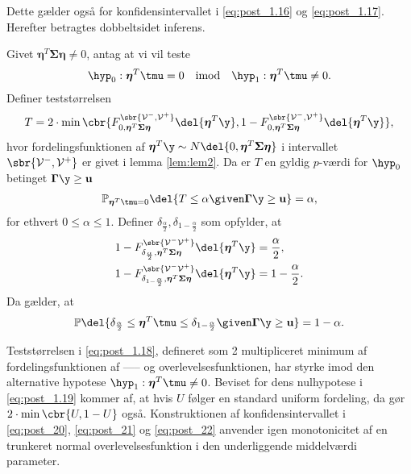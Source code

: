 Dette gælder også for konfidensintervallet i \eqref{eq:post_1.16} og \eqref{eq:post_1.17}.
Herefter betragtes dobbeltsidet inferens.
%
\begin{lem} \label{lem:lem4}
Givet \(\boldsymbol{\eta}^T \boldsymbol{\Sigma} \boldsymbol{\eta} \neq 0\), antag at vi vil teste
\begin{align*}
\hyp_0: \boldsymbol{\eta}^T \tmu=0 \quad \text{imod} \quad \hyp_1: \boldsymbol{\eta}^T \tmu \neq 0.
\end{align*}
Definer teststørrelsen
\begin{align}
T=2 \cdot \min\cbr{F_{0, \boldsymbol{\eta}^T \boldsymbol{\Sigma} \boldsymbol{\eta}}^{\sbr{\mathcal{V}^-, \mathcal{V}^+}} \del{\boldsymbol{\eta}^T \y}, 1 - F_{0, \boldsymbol{\eta}^T \boldsymbol{\Sigma} \boldsymbol{\eta}}^{\sbr{\mathcal{V}^-, \mathcal{V}^+}} \del{\boldsymbol{\eta}^T \y}}, \label{eq:post_1.18}
\end{align}
hvor fordelingsfunktionen af \(\boldsymbol{\eta}^T \y \sim N \del{0,  \boldsymbol{\eta}^T \boldsymbol{\Sigma} \boldsymbol{\eta}}\) i intervallet \(\sbr{\mathcal{V}^-, \mathcal{V}^+}\) er givet i lemma \ref{lem:lem2}.
Da er \(T\) en gyldig \(p\)-værdi for \(\hyp_0\) betinget \(\boldsymbol{\Gamma} \y \geq \mathbf{u}\)
\begin{align}
\mathbb{P}_{\boldsymbol{\eta}^T \tmu=0} \del{T \leq \alpha \given \boldsymbol{\Gamma} \y \geq \mathbf{u}} = \alpha, \label{eq:post_1.19}
\end{align}
for ethvert \(0 \leq \alpha \leq 1\). 
Definer \(\delta_{\frac{\alpha}{2}}, \delta_{1-\frac{\alpha}{2}}\) som opfylder, at
\begin{align}
1-F_{\delta_{\frac{\alpha}{2}}, \boldsymbol{\eta}^T \boldsymbol{\Sigma} \boldsymbol{\eta}}^{\sbr{\mathcal{V}^- \mathcal{V}^+}} \del{\boldsymbol{\eta}^T \y} &= \frac{\alpha}{2}, \label{eq:post_20} \\
1-F_{\delta_{1-\frac{\alpha}{2}}, \boldsymbol{\eta}^T \boldsymbol{\Sigma} \boldsymbol{\eta} }^{\sbr{\mathcal{V}^- \mathcal{V}^+}} \del{\boldsymbol{\eta}^T \y} &= 1-\frac{\alpha}{2}. \label{eq:post_21}
\end{align}
Da gælder, at
\begin{align}
\mathbb{P} \del{\delta_{\frac{\alpha}{2}} \leq  \boldsymbol{\eta}^T \tmu \leq \delta_{1-\frac{\alpha}{2}} \given \boldsymbol{\Gamma} \y \geq \mathbf{u}} = 1- \alpha. \label{eq:post_22}
\end{align}
\end{lem}
%
Teststørrelsen i \eqref{eq:post_1.18}, defineret som 2 multipliceret minimum af fordelingsfunktionen af ----- og overlevelsesfunktionen, har styrke imod den alternative hypotese \(\hyp_1: \boldsymbol{\eta}^T \tmu \neq 0\).
Beviset for dens nulhypotese i \eqref{eq:post_1.19} kommer af, at hvis \(U\) følger en standard uniform fordeling, da gør \(2 \cdot \min \cbr{U,1-U}\) også.
Konstruktionen af konfidensintervallet i \eqref{eq:post_20}, \eqref{eq:post_21} og \eqref{eq:post_22} anvender igen monotonicitet af en trunkeret normal overlevelsesfunktion i den underliggende middelværdi parameter.

